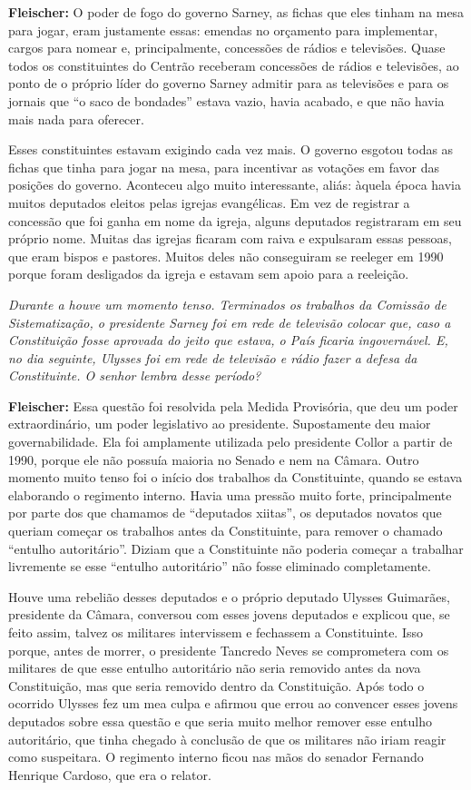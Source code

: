 \textbf{Fleischer:} O poder de fogo do governo Sarney, as fichas que
eles tinham na mesa para jogar, eram justamente essas: emendas no
orçamento para implementar, cargos para nomear e, principalmente,
concessões de rádios e televisões. Quase todos os constituintes do
Centrão receberam concessões de rádios e televisões, ao ponto de o
próprio líder do governo Sarney admitir para as televisões e para os
jornais que ``o saco de bondades'' estava vazio, havia acabado, e que
não havia mais nada para oferecer.

Esses constituintes estavam exigindo cada vez mais. O governo esgotou
todas as fichas que tinha para jogar na mesa, para incentivar as
votações em favor das posições do governo. Aconteceu algo muito
interessante, aliás: àquela época havia muitos deputados eleitos pelas
igrejas evangélicas. Em vez de registrar a concessão que foi ganha em
nome da igreja, alguns deputados registraram em seu próprio nome. Muitas
das igrejas ficaram com raiva e expulsaram essas pessoas, que eram
bispos e pastores. Muitos deles não conseguiram se reeleger em 1990
porque foram desligados da igreja e estavam sem apoio para a reeleição.

\emph{Durante a  houve um momento tenso. Terminados os trabalhos da
Comissão de Sistematização, o presidente Sarney foi em rede de televisão
colocar que, caso a Constituição fosse aprovada do jeito que estava, o
País ficaria ingovernável. E, no dia seguinte, Ulysses foi em rede de
televisão e rádio fazer a defesa da Constituinte. O senhor lembra desse
período?}

\textbf{Fleischer:} Essa questão foi resolvida pela Medida Provisória,
que deu um poder extraordinário, um poder legislativo ao presidente.
Supostamente deu maior governabilidade. Ela foi amplamente utilizada
pelo presidente Collor a partir de 1990, porque ele não possuía maioria
no Senado e nem na Câmara. Outro momento muito tenso foi o início dos
trabalhos da Constituinte, quando se estava elaborando o regimento
interno. Havia uma pressão muito forte, principalmente por parte dos que
chamamos de ``deputados xiitas'', os deputados novatos que queriam
começar os trabalhos antes da Constituinte, para remover o chamado
``entulho autoritário''. Diziam que a Constituinte não poderia começar a
trabalhar livremente se esse ``entulho autoritário'' não fosse eliminado
completamente.

Houve uma rebelião desses deputados e o próprio deputado Ulysses
Guimarães, presidente da Câmara, conversou com esses jovens deputados e
explicou que, se feito assim, talvez os militares intervissem e
fechassem a Constituinte. Isso porque, antes de morrer, o presidente
Tancredo Neves se comprometera com os militares de que esse entulho
autoritário não seria removido antes da nova Constituição, mas que seria
removido dentro da Constituição. Após todo o ocorrido Ulysses fez um mea
culpa e afirmou que errou ao convencer esses jovens deputados sobre essa
questão e que seria muito melhor remover esse entulho autoritário, que
tinha chegado à conclusão de que os militares não iriam reagir como
suspeitara. O regimento interno ficou nas mãos do senador Fernando
Henrique Cardoso, que era o relator.

